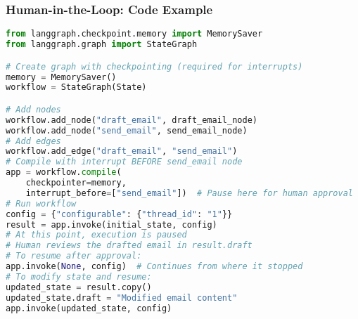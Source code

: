 \begin{frame}[fragile]\frametitle{Human-in-the-Loop: Code Example}
      \begin{lstlisting}[language=Python, basicstyle=\tiny]
from langgraph.checkpoint.memory import MemorySaver
from langgraph.graph import StateGraph

# Create graph with checkpointing (required for interrupts)
memory = MemorySaver()
workflow = StateGraph(State)

# Add nodes
workflow.add_node("draft_email", draft_email_node)
workflow.add_node("send_email", send_email_node)
# Add edges
workflow.add_edge("draft_email", "send_email")
# Compile with interrupt BEFORE send_email node
app = workflow.compile(
    checkpointer=memory,
    interrupt_before=["send_email"])  # Pause here for human approval
# Run workflow
config = {"configurable": {"thread_id": "1"}}
result = app.invoke(initial_state, config)
# At this point, execution is paused
# Human reviews the drafted email in result.draft
# To resume after approval:
app.invoke(None, config)  # Continues from where it stopped
# To modify state and resume:
updated_state = result.copy()
updated_state.draft = "Modified email content"
app.invoke(updated_state, config)
      \end{lstlisting}
\end{frame}

